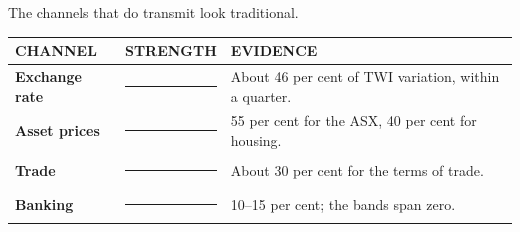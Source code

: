 \documentclass[aspectratio=169,11pt]{beamer}
\def\decksource{}
\newcommand{\src}[1]{\def\decksource{#1}}
\newcommand{\kicker}[1]{%
  {\fontsize{7.6}{9}\selectfont\color{teal}\bfseries\textls[130]{\MakeUppercase{#1}}}\par
  \vspace{0.16cm}}
\newcommand{\headline}[1]{%
  {\rmfamily\fontsize{18.4}{21.8}\selectfont\color{ink}#1\par}
  \vspace{0.34cm}}
\newcommand{\bodyfont}{\fontsize{9.7}{12.9}\selectfont}
\newcommand{\notefont}{\fontsize{7.1}{9.4}\selectfont}
\begin{document}
\begin{frame}[t]
\src{Section 5; Appendix C, Figure C1}
\vspace*{0.42cm}
\kicker{7 \enspace·\enspace Channels}
\headline{The channels that do transmit look traditional.}
\bodyfont

\begin{tabular}{@{}p{2.75cm} p{1.65cm} p{8.35cm}@{}}
\toprule
{\notefont\color{muted}CHANNEL} & {\notefont\color{muted}STRENGTH} & {\notefont\color{muted}EVIDENCE} \\
\midrule
\rule{0pt}{0.52cm}{\bfseries Exchange rate} & {\color{rule}\rule{1.20cm}{1.6pt}}\hspace{-1.20cm}{\color{teal}\rule{1.20cm}{1.6pt}} & About 46 per cent of TWI variation, within a quarter. \\
\rule{0pt}{0.52cm}{\bfseries Asset prices} & {\color{rule}\rule{1.20cm}{1.6pt}}\hspace{-1.20cm}{\color{teal}\rule{1.20cm}{1.6pt}} & 55 per cent for the ASX, 40 per cent for housing. \\
\rule{0pt}{0.50cm}{\bfseries Trade} & {\color{rule}\rule{1.20cm}{1.6pt}}\hspace{-1.20cm}{\color{teal}\rule{0.68cm}{1.6pt}} & About 30 per cent for the terms of trade. \\
\rule{0pt}{0.52cm}{\bfseries Banking} & {\color{rule}\rule{1.20cm}{1.6pt}}\hspace{-1.20cm}{\color{teal}\rule{0.18cm}{1.6pt}} & 10--15 per cent; the bands span zero. \\
\bottomrule
\end{tabular}

\vspace{0.40cm}
\end{frame}
\end{document}
